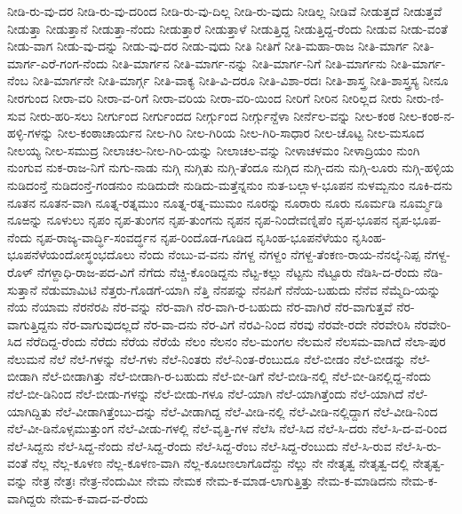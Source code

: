 {ನೀಡಿ-ರು-ವು-ದರ
ನೀಡಿ-ರು-ವು-ದರಿಂದ
ನೀಡಿ-ರು-ವು-ದಿಲ್ಲ
ನೀಡಿ-ರು-ವುದು
ನೀಡಿಲ್ಲ
ನೀಡಿವೆ
ನೀಡುತ್ತದೆ
ನೀಡುತ್ತವೆ
ನೀಡುತ್ತಾ
ನೀಡುತ್ತಾನೆ
ನೀಡುತ್ತಾ-ನೆಂದು
ನೀಡುತ್ತಾರೆ
ನೀಡುತ್ತಾಳೆ
ನೀಡುತ್ತಿದ್ದ
ನೀಡುತ್ತಿದ್ದ-ರೆಂದು
ನೀಡುವ
ನೀಡು-ವಂತೆ
ನೀಡು-ವಾಗ
ನೀಡು-ವು-ದನ್ನು
ನೀಡು-ವು-ದರ
ನೀಡು-ವುದು
ನೀತಿ
ನೀತಿಗೆ
ನೀತಿ-ಮಹಾ-ರಾಜ
ನೀತಿ-ಮಾರ್ಗ
ನೀತಿ-ಮಾರ್ಗ-ಎರೆ-ಗಂಗ-ನೆಂದು
ನೀತಿ-ಮಾರ್ಗನ
ನೀತಿ-ಮಾರ್ಗ-ನನ್ನು
ನೀತಿ-ಮಾರ್ಗ-ನಿಗೆ
ನೀತಿ-ಮಾರ್ಗನು
ನೀತಿ-ಮಾರ್ಗ-ನೆಂಬ
ನೀತಿ-ಮಾರ್ಗನೇ
ನೀತಿ-ಮಾರ್ಗ್ಗ
ನೀತಿ-ವಾಕ್ಯ
ನೀತಿ-ವಿ-ದರೂ
ನೀತಿ-ವಿಶಾ-ರದಃ
ನೀತಿ-ಶಾಸ್ತ್ರ
ನೀತಿ-ಶಾಸ್ತ್ರಸ್ಯ
ನೀನೂ
ನೀರಗುಂದ
ನೀರಾ-ವರಿ
ನೀರಾ-ವ-ರಿಗೆ
ನೀರಾ-ವರಿಯ
ನೀರಾ-ವರಿ-ಯಿಂದ
ನೀರಿಗೆ
ನೀರಿನ
ನೀರಿಲ್ಲದ
ನೀರು
ನೀರು-ಣಿ-ಸುವ
ನೀರು-ಹರಿ-ಸಲು
ನೀರ್ಗುಂದ
ನೀರ್ಗುಂದದ
ನೀರ್ಗ್ಗುಂದ
ನೀರ್ಗ್ಗುನ್ದೆಳಾ
ನೀರ್ನೆಲ-ವನ್ನು
ನೀಲ-ಕಂಠ
ನೀಲ-ಕಂಠ-ನ-ಹಳ್ಳಿ-ಗಳನ್ನು
ನೀಲ-ಕಂಠಾಚಾರ್ಯನ
ನೀಲ-ಗಿರಿ
ನೀಲ-ಗಿರಿಯ
ನೀಲ-ಗಿರಿ-ಸಾಧಾರ
ನೀಲ-ಚೊಟ್ಟ
ನೀಲ-ಮಸೂದ
ನೀಲಯ್ಯ
ನೀಲ-ಸಮುದ್ರ
ನೀಲಾಚಲ-ನೀಲ-ಗಿರಿ-ಯನ್ನು
ನೀಲಾಚಲ-ವನ್ನು
ನೀಳಾಚಳಮಂ
ನೀಳಾದ್ರಿಯಂ
ನುಂಗಿ
ನುಂಗುವ
ನುಕ-ರಾಜ-ನಿಗೆ
ನುಗು-ನಾಡು
ನುಗ್ಗಿ
ನುಗ್ಗಿತು
ನುಗ್ಗಿ-ತೆಂದೂ
ನುಗ್ಗಿದ
ನುಗ್ಗಿ-ದನು
ನುಗ್ಗಿ-ಲೂರು
ನುಗ್ಗಿ-ಹಳ್ಳಿಯ
ನುಡಿದಂನ್ತೆ
ನುಡಿದಂನ್ತೆ-ಗಂಡನುಂ
ನುಡಿದುದೇ
ನುಡಿದು-ಮತ್ತೆನ್ನನುಂ
ನುತ-ಬಲ್ಲಾಳ-ಭೂಪನ
ನುಳಮ್ಬನುಂ
ನೂಕಿ-ದನು
ನೂತನ
ನೂತನ-ವಾಗಿ
ನೂತ್ನ-ರತ್ನಮುಂ
ನೂತ್ನ-ರತ್ನ-ಮುಮಂ
ನೂರನ್ನು
ನೂರಾರು
ನೂರು
ನೂರ್ಮಡಿ
ನೂರ್ಮ್ಮಡಿ
ನೂಱನ್ನು
ನೂಳುಲು
ನೃಪಂ
ನೃಪ-ತುಂಗನ
ನೃಪ-ತುಂಗನು
ನೃಪನ
ನೃಪ-ನಿಂದೇವಣ್ನಿಪೆಂ
ನೃಪ-ಭೂಪನ
ನೃಪ-ಭೂಪ-ನೆಂದು
ನೃಪ-ರಾಜ್ಯ-ವಾರ್ದ್ಧಿ-ಸಂವರ್ದ್ಧನ
ನೃಪ-ರಿಂದೊಡ-ಗೂಡಿದ
ನೃಸಿಂಹ-ಭೂಪನೆಳೆಯಂ
ನೃಸಿಂಹ-ಭೂಪನೆಳೆಯಂದೋಸ್ಥಂಭದೊಲು
ನೆಂದು
ನೆಂಬು-ವ-ವನು
ನೆಗಳ್ದ
ನೆಗಳ್ದಂ
ನೆಗಳ್ದ-ತೆಂಕಣ-ರಾಯ-ನೆನಲ್ಕೆ-ನಿಪ್ಪ
ನೆಗಳ್ದ-ರೊಳ್
ನೆಗಳ್ದಾಧಿ-ರಾಜ-ಪದ-ವಿಗೆ
ನೆಗೆದು
ನೆಚ್ಚಿ-ಕೊಂಡಿದ್ದನು
ನೆಟ್ಟ-ಕಲ್ಲು
ನೆಟ್ಟನು
ನೆಟ್ಟೂರು
ನೆಡಿಸಿ-ದ-ರೆಂದು
ನೆಡಿ-ಸುತ್ತಾನೆ
ನೆಡುಮಾಮಿಟಿ
ನೆತ್ತರು-ಗೊಡಗೆ-ಯಾಗಿ
ನೆತ್ತಿ
ನೆನಪನ್ನು
ನೆನಪಿಗೆ
ನೆನೆಯ-ಬಹುದು
ನೆನೆವ
ನೆಮ್ಮೆದಿ-ಯನ್ನು
ನೆಯ
ನೆಯಾಮ
ನೆರನೆರಪಿ
ನೆರ-ವನ್ನು
ನೆರ-ವಾಗಿ
ನೆರ-ವಾಗಿ-ರ-ಬಹುದು
ನೆರ-ವಾಗಿರೆ
ನೆರ-ವಾಗುತ್ತವೆ
ನೆರ-ವಾಗುತ್ತಿದ್ದನು
ನೆರ-ವಾಗುವುದಲ್ಲದೆ
ನೆರ-ವಾ-ದನು
ನೆರ-ವಿಗೆ
ನೆರವಿ-ನಿಂದ
ನೆರವು
ನೆರವೇ-ರದೇ
ನೆರವೇರಿಸಿ
ನೆರವೇರಿ-ಸಿದ
ನೆರೆದಿದ್ದ-ರೆಂದು
ನೆರೆದು
ನೆರೆಯ
ನೆರೆಯೆ
ನೆಲಂ
ನೆಲನಂ
ನೆಲ-ಮಂಗಲ
ನೆಲಮನೆ
ನೆಲಸಮ-ವಾಗಿದೆ
ನೆಲಾ-ಪುರ
ನೆಲುಮನೆ
ನೆಲೆ
ನೆಲೆ-ಗಳನ್ನು
ನೆಲೆ-ಗಳು
ನೆಲೆ-ನಿಂತರು
ನೆಲೆ-ನಿಂತ-ರೆಂಬುದೂ
ನೆಲೆ-ಬೀಡಂ
ನೆಲೆ-ಬೀಡನ್ನು
ನೆಲೆ-ಬೀಡಾಗಿ
ನೆಲೆ-ಬೀಡಾಗಿತ್ತು
ನೆಲೆ-ಬೀಡಾಗಿ-ರ-ಬಹುದು
ನೆಲೆ-ಬೀ-ಡಿಗೆ
ನೆಲೆ-ಬೀಡಿ-ನಲ್ಲಿ
ನೆಲೆ-ಬೀ-ಡಿನಲ್ಲಿದ್ದ-ನೆಂದು
ನೆಲೆ-ಬೀ-ಡಿನಿಂದ
ನೆಲೆ-ಬೀಡು-ಗಳನ್ನು
ನೆಲೆ-ಬೀಡು-ಗಳೂ
ನೆಲೆ-ಯಾಗಿ
ನೆಲೆ-ಯಾಗಿತ್ತೆಂದು
ನೆಲೆ-ಯಾಗಿದೆ
ನೆಲೆ-ಯಾಗಿದ್ದಿತು
ನೆಲೆ-ವೀಡಾಗಿತ್ತೆಂಬು-ದನ್ನು
ನೆಲೆ-ವೀಡಾಗಿದ್ದ
ನೆಲೆ-ವೀಡಿ-ನಲ್ಲಿ
ನೆಲೆ-ವೀಡಿ-ನಲ್ಲಿದ್ದಾಗ
ನೆಲೆ-ವೀಡಿ-ನಿಂದ
ನೆಲೆ-ವೀ-ಡಿನೊಳ್ಸಮುತ್ತುಂಗ
ನೆಲೆ-ವೀಡು-ಗಳಲ್ಲಿ
ನೆಲೆ-ವೃತ್ತಿ-ಗಳ
ನೆಲೆಸಿ
ನೆಲೆ-ಸಿದ
ನೆಲೆ-ಸಿ-ದರು
ನೆಲೆ-ಸಿ-ದ-ವ-ರಿಂದ
ನೆಲೆ-ಸಿದ್ದನು
ನೆಲೆ-ಸಿದ್ದ-ನೆಂದು
ನೆಲೆ-ಸಿದ್ದ-ರೆಂದು
ನೆಲೆ-ಸಿದ್ದ-ರೆಂಬ
ನೆಲೆ-ಸಿದ್ದ-ರೆಂಬುದು
ನೆಲೆ-ಸಿ-ರುವ
ನೆಲೆ-ಸಿ-ರು-ವಂತೆ
ನೆಲ್ಲ
ನೆಲ್ಲ-ಕೂಳಣ
ನೆಲ್ಲ-ಕೂಳಣ-ವಾಗಿ
ನೆಲ್ಲ-ಕೂೞಣಲಾಗೊದೆನ್ದು
ನೆಲ್ಲು
ನೇ
ನೇತೃತ್ವ
ನೇತೃತ್ವ-ದಲ್ಲಿ
ನೇತೃತ್ವ-ವನ್ನು
ನೇತ್ರ
ನೇತ್ರಃ
ನೇತ್ರ-ನೆಂದುಮೀ
ನೇಮ
ನೇಮಕ
ನೇಮ-ಕ-ಮಾಡ-ಲಾಗುತ್ತಿತ್ತು
ನೇಮ-ಕ-ಮಾಡಿದನು
ನೇಮ-ಕ-ವಾಗಿದ್ದರು
ನೇಮ-ಕ-ವಾದ-ವ-ರೆಂದು
}
